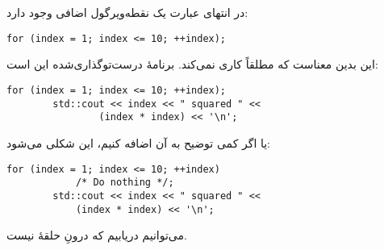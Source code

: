 \section{}
\paragraph{}\label{answer:34}
در انتهای عبارت  یک نقطه‌ویرگول اضافی وجود دارد:
\begin{LTR}
    \begin{lstlisting}[style=C++Style]
        for (index = 1; index <= 10; ++index);
    \end{lstlisting}
\end{LTR}

این بدین معناست که  مطلقاً کاری نمی‌کند. برنامهٔ درست‌توگذاری‌شده این است:
\begin{LTR}
    \begin{lstlisting}[style=C++Style]
        for (index = 1; index <= 10; ++index);
        std::cout << index << " squared " <<
                (index * index) << '\n';
    \end{lstlisting}
\end{LTR}
یا اگر کمی توضیح به آن اضافه کنیم، این شکلی می‌شود:
\begin{LTR}
    \begin{lstlisting}[style=C++Style]
        for (index = 1; index <= 10; ++index)
            /* Do nothing */;
        std::cout << index << " squared " <<
            (index * index) << '\n';
    \end{lstlisting}
\end{LTR}
می‌توانیم دریابیم که  درونِ حلقهٔ  نیست.